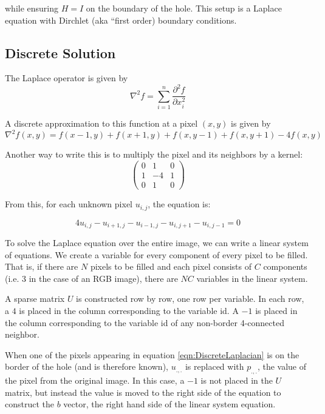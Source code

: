 \documentclass{InsightArticle}
\begin{document}
while ensuring $H=I$ on the boundary of the hole. This setup is a Laplace equation with Dirchlet (aka ``first order) boundary conditions. 

\subsection{Discrete Solution}
The Laplace operator is given by
\begin{equation}
 \nabla^2 f = \sum_{i=1}^n \frac{\partial^2 f}{\partial x_i^2}
\end{equation}

A discrete approximation to this function at a pixel $(x,y)$ is given by
\begin{equation}
 \nabla^2 f(x,y) = f(x-1,y) + f(x+1,y) + f(x,y-1) + f(x,y+1) - 4f(x,y)
\end{equation}

Another way to write this is to multiply the pixel and its neighbors by a kernel:
\begin{equation}
\begin{pmatrix}
0 & 1 & 0 \\
1 & -4 & 1\\
0 & 1 & 0
\end{pmatrix}
\end{equation}


From this, for each unknown pixel $u_{i,j}$, the equation is:

\begin{equation}
\label{eqn:DiscreteLaplacian}
4 u_{i,j} - u_{i+1,j} - u_{i-1,j} - u_{i,j+1} - u_{i,j-1} = 0
\end{equation}

To solve the Laplace equation over the entire image, we can write a linear system of equations. We create a variable for every component of every pixel to be filled. That is, if there are $N$ pixels to be filled and each pixel consists of $C$ components (i.e. 3 in the case of an RGB image), there are $NC$ variables in the linear system. 

A sparse matrix $U$ is constructed row by row, one row per variable. In each row, a $4$ is placed in the column corresponding to the variable id. A $-1$ is placed in the column corresponding to the variable id of any non-border 4-connected neighbor.

When one of the pixels appearing in equation \ref{eqn:DiscreteLaplacian} is on the border of the hole (and is therefore known), $u_{.,.}$ is replaced with $p_{.,.}$, the value of the pixel from the original image. In this case, a $-1$ is not placed in the $U$ matrix, but instead the value is moved to the right side of the equation to construct the $b$ vector, the right hand side of the linear system equation.
\end{document}
